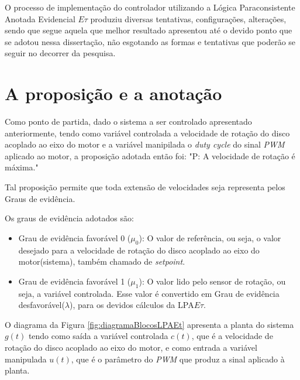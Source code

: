 
O processo de implementação do controlador utilizando a 
Lógica Paraconsistente Anotada Evidencial $E\tau$
produziu diversas tentativas, configurações, alterações, 
sendo que segue aquela que melhor resultado apresentou até
o devido ponto que se adotou nessa dissertação, 
não esgotando as formas e tentativas que poderão se seguir 
no decorrer da pesquisa.



\section{A proposição e a anotação}

Como ponto de partida, 
dado o sistema a ser controlado apresentado anteriormente, 
tendo como variável controlada 
a velocidade de rotação do disco acoplado ao eixo do motor e 
a variável manipilada o \emph{duty cycle} do sinal \emph{PWM} aplicado ao motor,
a proposição adotada então foi: 
"P: A velocidade de rotação é máxima."

Tal proposição permite que toda extensão de velocidades 
seja representa pelos Graus de evidência.

Os graus de evidência adotados são: 

\begin{itemize}
\item Grau de evidência favorável 0 ($\mu_0$): 
O valor de referência, ou seja, 
o valor desejado para a velocidade de rotação do 
disco acoplado ao eixo do motor(sistema),
também chamado de \emph{setpoint}.
\item Grau de evidência favorável 1 ($\mu_1$): 
O valor lido pelo sensor de rotação, ou seja, a variável controlada.
Esse valor é convertido em 
Grau de evidência desfavorável($\lambda$),
para os devidos cálculos da LPA$E\tau$.
\end{itemize}

O diagrama da Figura \ref{fig:diagramaBlocosLPAEt} apresenta 
a planta do sistema $g(t)$ tendo como saída a 
variável controlada $c(t)$, 
que é a velocidade de rotação do disco 
acoplado ao eixo do motor, 
e como entrada a variável manipulada $u(t)$, 
que é o parâmetro do \emph{PWM} 
que produz a sinal aplicado à planta.



